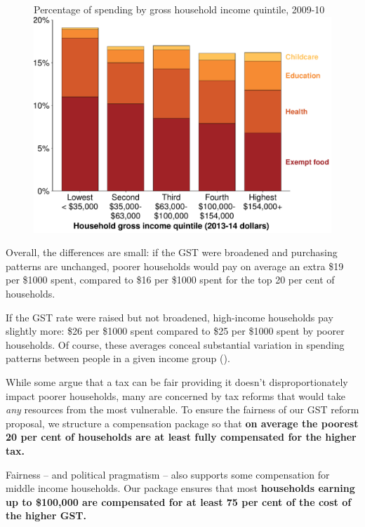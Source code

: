 \begin{figure}
%
{Percentage of spending by gross household income quintile, 2009-10}
\includegraphics[width=\columnwidth]{atlas/figure/GST-Figure-4-1-tikzd.pdf}
\end{figure}

Overall, the differences are small: if the GST were broadened and purchasing patterns are unchanged, poorer households would pay on average an extra \$19 per \$1000 spent, compared to \$16 per \$1000 spent for the top 20 per cent of households. 

If the GST rate were raised but not broadened, high-income households pay slightly more:  \$26 per \$1000 spent compared to \$25 per \$1000 spent by poorer households. Of course, these averages conceal substantial variation in spending patterns between people in a given income group ().

While some argue that a tax can be fair providing it doesn’t disproportionately impact poorer households, many are concerned by tax reforms that would take \emph{any} resources from the most vulnerable. To ensure the fairness of our GST reform proposal, we structure a compensation package so that \textbf{on average the poorest 20 per cent of households are at least fully compensated for the higher tax.} 

Fairness – and political pragmatism – also supports some compensation for middle income households. Our package ensures that most \textbf{households earning up to \$100,000 are compensated for at least 75 per cent of the cost of the higher GST.}

